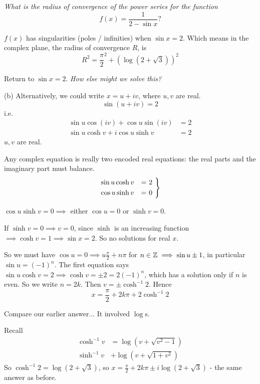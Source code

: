 \documentclass[10pt]{scrartcl}
\begin{document}
\emph{What is the radius of convergence of the power series for the function}
\[
  f(x) = \frac{1}{2-\sin x}?
\]

$f(x)$ has singularities (poles / infinities) when $\sin x = 2$. Which means in the complex plane, the radius of convergence $R$, is 
\[
  R^2 = \frac{\pi}{2}^2 + (\log(2 + \sqrt{3}))^2
\]



Return to  $\sin x = 2$. \emph{How else might we solve this?} 

(b) Alternatively, we could write $x = u + iv$, where $u,v$ are real. 
\[
  \sin(u + iv)= 2
\]
i.e. \begin{align*}
  \sin u \cos(iv) + \cos u \sin (iv) &= 2\\
  \sin u \cosh v + i\cos u \sinh v &=2
\end{align*}
$u,v$ are real.

Any complex equation is really two encoded real equations: the real parts and the imaginary part must balance. 
\[
  \begin{rcases*}
  \sin u \cosh v &= 2\\
  \cos u \sinh v &= 0	
  \end{rcases*}
\]

$\cos u \sinh v= 0 \implies$ either $\cos u = 0$ or $\sinh v = 0$. 

If $\sinh v = 0 \implies v = 0$, since $\sinh$ is an increasing function $\implies \cosh v= 1 \implies \sin x = 2$. So no solutions for real $x$. 

So we must have $\cos u = 0 \implies u \frac{\pi}{2} + n\pi$ for $n \in\mathbb{Z} \implies \sin u \pm 1$, in particular $\sin u = (-1)^n$. The first equation says $\sin u \cosh v = 2 \implies \cosh v = \pm 2 = 2(-1)^n$, which has a solution only if $n$ is even. So we write $n = 2k$. Then $v = \pm \cosh^{-1}2$. Hence \[x = \frac{\pi}{2} + 2k\pi + 2\cosh^{-1}2\]

Compare our earlier answer... It involved $\log$s. 

Recall
\begin{align*}
  \cosh^{-1}v &= \log(v + \sqrt{v^2 - 1})\\
  \sinh^{-1}v &+ \log(v + \sqrt{1 + v^2})
\end{align*}
So $\cosh^{-1}2 = \log(2 + \sqrt{3})$, so $x = \frac{\pi}{2} + 2k\pi \pm i \log(2 + \sqrt{3})$ - the same answer as before. 
\end{document}
